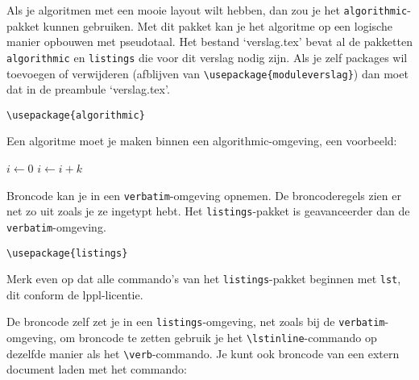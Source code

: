 
Als je algoritmen met een mooie layout wilt hebben, dan zou je het
\verb!algorithmic!-pakket kunnen gebruiken. Met dit pakket kan je het
algoritme op een logische manier opbouwen met pseudotaal. Het bestand
`verslag.tex' bevat al de pakketten \verb!algorithmic! en
\verb!listings! die voor dit verslag nodig zijn. Als je zelf packages
wil toevoegen of verwijderen (afblijven van
\verb!\usepackage{moduleverslag}!)  dan moet dat in de preambule
`verslag.tex'.

\begin{Aanpassen}
\begin{verbatim}
\usepackage{algorithmic}
\end{verbatim}
\end{Aanpassen}

Een algoritme moet je maken binnen een algorithmic-omgeving, een
voorbeeld:

\begin{Aanpassen}[\small]
\begin{algorithmic}
        \STATE $i\gets 0$
\ELSE
                \STATE $i\gets i+k$
        \ENDIF
\ENDIF 
\end{algorithmic}
\end{Aanpassen}


Broncode kan je in een \verb!verbatim!-omgeving opnemen. De
broncoderegels zien er net zo uit zoals je ze ingetypt hebt.  Het
\verb!listings!-pakket is geavanceerder dan de
\verb!verbatim!-omgeving.

\begin{Aanpassen}
\begin{verbatim}
\usepackage{listings}
\end{verbatim}
\end{Aanpassen}

Merk even op dat alle commando's van het \verb!listings!-pakket
beginnen met \verb!lst!, dit conform de lppl-licentie.

De broncode zelf zet je in een \verb!listings!-omgeving, net zoals bij
de \verb!verbatim!-omgeving, om broncode te zetten gebruik je het
\verb!\lstinline!-commando op dezelfde manier als het
\verb!\verb!-commando. Je kunt ook broncode van een extern document laden met het commando:

\begin{Aanpassen}
\begin{verbatim}

\end{verbatim}
\end{Aanpassen}

